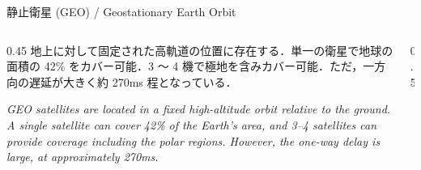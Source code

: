 \documentclass[11pt, aspectratio=169]{beamer}
\begin{document}
\begin{frame}[c]{静止衛星 (GEO) / Geostationary Earth Orbit}
  \begin{columns}[c]
    \begin{column}{0.45\textwidth}
      地上に対して固定された高軌道の位置に存在する．単一の衛星で地球の面積の 42\% をカバー可能．3 ～ 4 機で極地を含みカバー可能．ただ，一方向の遅延が大きく約 270ms 程となっている．

      \vspace{1em}
      \textit{GEO satellites are located in a fixed high-altitude orbit relative to the ground. A single satellite can cover 42\% of the Earth's area, and 3--4 satellites can provide coverage including the polar regions. However, the one-way delay is large, at approximately 270ms.}
    \end{column}

    \begin{column}{0.5\textwidth}
      \begin{center}
      \end{center}
    \end{column}
  \end{columns}
\end{frame}
\end{document}
